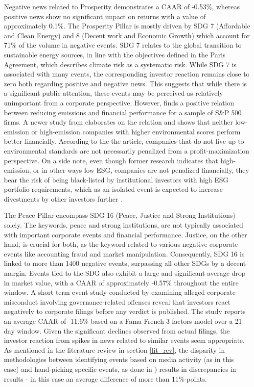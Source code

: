 Negative news related to Prosperity demonstrates a CAAR of -0.53\%, whereas positive news show no significant impact on returns with a value of approximately 0.1\%. The Prosperity Pillar is mostly driven by SDG 7 (Affordable and Clean Energy) and 8 (Decent work and Economic Growth) which account for 71\% of the volume in negative events. SDG 7 relates to the global transition to sustainable energy sources, in line with the objectives defined in the Paris Agreement, which describes climate risk as a systematic risk. While SDG 7 is associated with many events, the corresponding investor reaction remains close to zero both regarding positive and negative news. This suggests that while there is a significant public attention, these events may be perceived as relatively unimportant from a corporate perspective. However, \cite{hart1996does} finds a positive relation between reducing emissions and financial performance for a sample of S\&P 500 firms. A newer study from \cite{being_green} elaborates on the relation and shows that neither low-emission or high-emission companies with higher environmental scores perform better financially. According to the the article, companies that do not live up to environmental standards are not necessarily penalized from a profit-maximization perspective. On a side note, even though former research indicates that high-emission, or in other ways low ESG, companies are not penalized financially, they bear the risk of being black-listed by institutional investors with high ESG portfolio requirements, which as an isolated event is expected to increase divestments by other investors further \cite{dell2021norwegian}. 

The Peace Pillar encompass SDG 16 (Peace, Justice and Strong Institutions) solely. The keywords, peace and strong institutions, are not typically associated with important corporate events and financial performance. Justice, on the other hand, is crucial for both, as the keyword related to various negative corporate events like accounting fraud and market manipulation. Consequently, SDG 16 is linked to more than 1400 negative events, surpassing all other SDGs by a decent margin. Events tied to the SDG also exhibit a large and significant average drop in market value, with a CAAR of approximately -0.57\% throughout the entire window. A short term event study conducted by \cite{bauer2010misdeeds} examining alleged corporate misconduct involving governance-related offenses reveal that investors react negatively to corporate filings before any verdict is published. The study reports an average CAAR of -11.6\% based on a Fama-French 3 factors model over a 21-day window. Given the significant declines observed from actual filings, the investor reaction from spikes in news related to similar events seem appropriate. As mentioned in the literature review in section \ref{lit_rev}, the disparity in methodologies between identifying events based on media activity (as in this case) and hand-picking specific events, as done in \citeauthor{bauer2010misdeeds}) results in discrepancies in results - in this case an average difference of more than 11\%-points. 

